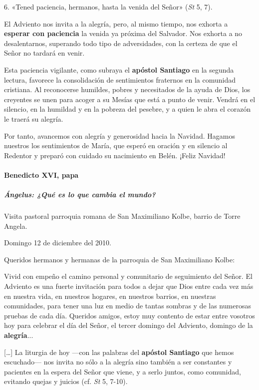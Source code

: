 \documentclass[]{article}
\let\oldparagraph\paragraph
\renewcommand{\paragraph}[1]{\oldparagraph{#1}\mbox{}}
\let\oldsubparagraph\subparagraph
\renewcommand{\subparagraph}[1]{\oldsubparagraph{#1}\mbox{}}
\begin{document}
6. «Tened paciencia, hermanos, hasta la venida del Señor» (\emph{St} 5,
7).

El Adviento nos invita a la alegría, pero, al mismo tiempo, nos exhorta
a \textbf{esperar con paciencia} la venida ya próxima del Salvador. Nos
exhorta a no desalentarnos, superando todo tipo de adversidades, con la
certeza de que el Señor no tardará en venir.

Esta paciencia vigilante, como subraya el \textbf{apóstol Santiago} en
la segunda lectura, favorece la consolidación de sentimientos fraternos
en la comunidad cristiana. Al reconocerse humildes, pobres y necesitados
de la ayuda de Dios, los creyentes se unen para acoger a su Mesías que
está a punto de venir. Vendrá en el silencio, en la humildad y en la
pobreza del pesebre, y a quien le abra el corazón le traerá su alegría.

Por tanto, avancemos con alegría y generosidad hacia la Navidad. Hagamos
nuestros los sentimientos de María, que esperó en oración y en silencio
al Redentor y preparó con cuidado su nacimiento en Belén. ¡Feliz
Navidad!

\paragraph{Benedicto XVI, papa}\label{benedicto-xvi-papa-2}

\subparagraph{Ángelus: ¿Qué es lo que cambia el
mundo?}\label{uxe1ngelus-quuxe9-es-lo-que-cambia-el-mundo}

Visita pastoral parroquia romana de San Maximiliano Kolbe, barrio de
Torre Angela.

Domingo 12 de diciembre del 2010.

Queridos hermanos y hermanas de la parroquia de San Maximiliano Kolbe:

Vivid con empeño el camino personal y comunitario de seguimiento del
Señor. El Adviento es una fuerte invitación para todos a dejar que Dios
entre cada vez más en nuestra vida, en nuestros hogares, en nuestros
barrios, en nuestras comunidades, para tener una luz en medio de tantas
sombras y de las numerosas pruebas de cada día. Queridos amigos, estoy
muy contento de estar entre vosotros hoy para celebrar el día del Señor,
el tercer domingo del Adviento, domingo de la \textbf{alegría}...

[\ldots{}] La liturgia de hoy ---con las palabras del \textbf{apóstol
Santiago} que hemos escuchado--- nos invita no sólo a la alegría sino
también a ser constantes y pacientes en la espera del Señor que viene, y
a serlo juntos, como comunidad, evitando quejas y juicios (cf. \emph{St}
5, 7-10).
\end{document}
